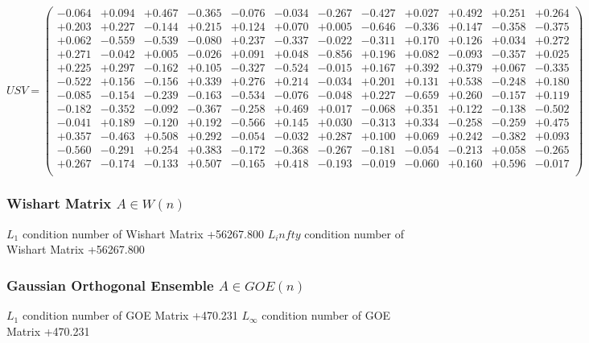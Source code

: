 \documentclass[9pt]{article}
\theoremstyle{plain}
\theoremstyle{definition}
\theoremstyle{remark}
\numberwithin{equation}{section}
\begin{document}
$U S V = \left(
\begin{array}{
cccccccccccc}
-0.064 & +0.094 & +0.467 & -0.365 & -0.076 & -0.034 & -0.267 & -0.427 & +0.027 & +0.492 & +0.251 & +0.264 \\
+0.203 & +0.227 & -0.144 & +0.215 & +0.124 & +0.070 & +0.005 & -0.646 & -0.336 & +0.147 & -0.358 & -0.375 \\
+0.062 & -0.559 & -0.539 & -0.080 & +0.237 & -0.337 & -0.022 & -0.311 & +0.170 & +0.126 & +0.034 & +0.272 \\
+0.271 & -0.042 & +0.005 & -0.026 & +0.091 & +0.048 & -0.856 & +0.196 & +0.082 & -0.093 & -0.357 & +0.025 \\
+0.225 & +0.297 & -0.162 & +0.105 & -0.327 & -0.524 & -0.015 & +0.167 & +0.392 & +0.379 & +0.067 & -0.335 \\
-0.522 & +0.156 & -0.156 & +0.339 & +0.276 & +0.214 & -0.034 & +0.201 & +0.131 & +0.538 & -0.248 & +0.180 \\
-0.085 & -0.154 & -0.239 & -0.163 & -0.534 & -0.076 & -0.048 & +0.227 & -0.659 & +0.260 & -0.157 & +0.119 \\
-0.182 & -0.352 & -0.092 & -0.367 & -0.258 & +0.469 & +0.017 & -0.068 & +0.351 & +0.122 & -0.138 & -0.502 \\
-0.041 & +0.189 & -0.120 & +0.192 & -0.566 & +0.145 & +0.030 & -0.313 & +0.334 & -0.258 & -0.259 & +0.475 \\
+0.357 & -0.463 & +0.508 & +0.292 & -0.054 & -0.032 & +0.287 & +0.100 & +0.069 & +0.242 & -0.382 & +0.093 \\
-0.560 & -0.291 & +0.254 & +0.383 & -0.172 & -0.368 & -0.267 & -0.181 & -0.054 & -0.213 & +0.058 & -0.265 \\
+0.267 & -0.174 & -0.133 & +0.507 & -0.165 & +0.418 & -0.193 & -0.019 & -0.060 & +0.160 & +0.596 & -0.017 \\
\end{array}
\right)$ \newline 

\subsubsection{Wishart Matrix $A \in W(n)$}
$L_1$ condition number of Wishart Matrix +56267.800
$L_infty$ condition number of Wishart Matrix +56267.800
\subsubsection{Gaussian Orthogonal Ensemble $A \in GOE(n)$}
$L_1$ condition number of GOE Matrix +470.231
$L_\infty$ condition number of GOE Matrix +470.231
\end{document}
